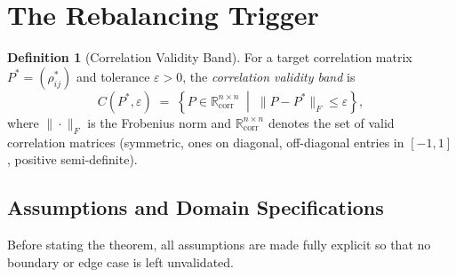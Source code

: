 \documentclass[12pt,openany]{book}
\newcommand{\R}{\mathbb{R}}
\newcommand{\calC}{\mathcal{C}}
\numberwithin{equation}{chapter}
\theoremstyle{plain}
\theoremstyle{definition}
\newtheorem{definition}[theorem]{Definition}
\theoremstyle{remark}
\def\mathcal#1{#1}%
\def\calC{C}%
\begin{document}
\section{The Rebalancing Trigger}

\begin{definition}[Correlation Validity Band]
\label{def:corr-band}
For a target correlation matrix $P^* = (\rho^*_{ij})$ and tolerance
$\varepsilon > 0$, the \emph{correlation validity band} is
\begin{equation}
  \calC(P^*, \varepsilon)
  \;=\;
  \left\{
    P \in \R^{n \times n}_{\mathrm{corr}}
    \;\middle|\;
    \|P - P^*\|_F \leq \varepsilon
  \right\},
  \label{eq:corr-band}
\end{equation}
where $\|\cdot\|_F$ is the Frobenius norm and
$\R^{n\times n}_{\mathrm{corr}}$ denotes the set of valid correlation
matrices (symmetric, ones on diagonal, off-diagonal entries in $[-1,1]$,
positive semi-definite).
\end{definition}

\subsection*{Assumptions and Domain Specifications}
\label{ssec:trigger-assumptions}

Before stating the theorem, all assumptions are made fully explicit
so that no boundary or edge case is left unvalidated.
\end{document}
